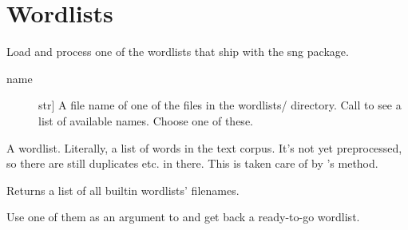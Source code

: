 \documentclass[letterpaper,10pt,english]{sphinxmanual}
\begin{document}
\section{Wordlists}
\label{\detokenize{modules:module-sng.wordlists.wordlists}}\label{\detokenize{modules:wordlists}}

\begin{fulllineitems}
\label{\detokenize{modules:sng.wordlists.wordlists.load_builtin_wordlist}}
Load and process one of the wordlists that ship with the sng package.
\begin{description}
\item[{name}] \leavevmode{[}str{]}
A file name of one of the files in the wordlists/ directory.
Call {\hyperref[\detokenize{modules:sng.wordlists.wordlists.show_builtin_wordlists}]{}} to see a list of available
names. Choose one of these.

\end{description}

A wordlist. Literally, a list of words in the text corpus.
It’s not yet preprocessed, so there are still duplicates etc. in there.
This is taken care of by {\hyperref[\detokenize{modules:module-sng.Generator}]{}}’s  method.

\end{fulllineitems}


\begin{fulllineitems}
\label{\detokenize{modules:sng.wordlists.wordlists.show_builtin_wordlists}}
Returns a list of all builtin wordlists’ filenames.

Use one of them as an argument to {\hyperref[\detokenize{modules:sng.wordlists.wordlists.load_builtin_wordlist}]{}}
and get back a ready-to-go wordlist.

\end{fulllineitems}
\end{document}

